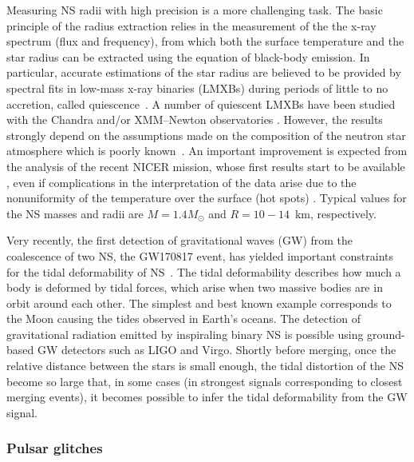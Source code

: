 Measuring NS radii with high precision is a more challenging task.
The basic principle of the radius extraction relies in the measurement of the 
the x-ray spectrum (flux and frequency), from which both the surface 
temperature and the star radius can be extracted using the equation of 
black-body emission.
In particular, accurate estimations of the star radius are believed to be 
provided by spectral fits in low-mass x-ray binaries (LMXBs) during periods of 
little to no accretion, called quiescence~\cite{Brown1998}.
%
A number of quiescent LMXBs have been studied with the Chandra and/or 
XMM–Newton 
observatories \cite{Heinke2014,Servillat2012,Guillot2014,Guillot2013}.
%
However, the results strongly depend on the assumptions made on the composition
of the neutron star atmosphere which is poorly known~\cite{Steiner2018}. 
An important improvement is expected from the analysis of the recent NICER 
mission, whose first results start to be available 
\cite{Bogdanov2019a,Bogdanov2019b,Miller2019,Raaijmakers2019,Riley2019}, 
even if complications in the interpretation of the 
data arise due to the nonuniformity of the temperature over the surface (hot
spots) \cite{Bogdanov2019a,Bogdanov2019b,Miller2019,Raaijmakers2019,Riley2019}. 
{Typical values} for the NS masses and radii are $M = 1.4M_\odot$ and
$R=10-14$~km, respectively.
 
Very recently, the first detection of gravitational waves (GW) from the 
coalescence 
of two NS, the GW170817 event, has yielded important constraints for the tidal 
deformability of NS~\cite{GW1}.
The tidal deformability describes how much a body is deformed by tidal forces,
which arise when two massive bodies are in orbit around each other. 
The simplest and best known example corresponds to the Moon causing the tides 
observed in Earth's oceans.
The detection of gravitational radiation emitted by inspiraling binary NS 
is possible using ground-based GW detectors such as LIGO 
and Virgo. 
Shortly before merging, once the relative distance between the stars is small
enough, the tidal distortion of the NS become so large that, in some cases (in
strongest signals corresponding to closest merging events), it becomes possible 
to infer the tidal deformability from the GW signal. 

\subsubsection*{Pulsar glitches}

